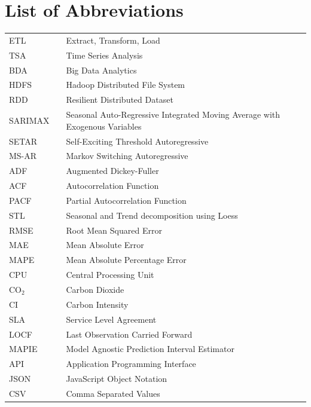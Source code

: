 \documentclass[12pt]{report}
\begin{document}
	\cleardoublepage
	
	
	
	\chapter*{List of Abbreviations\hfill} 
	\begin{tabular}{lll}
		ETL & & Extract, Transform, Load \\
		TSA & & Time Series Analysis \\
		BDA & & Big Data Analytics \\
		HDFS & & Hadoop Distributed File System \\
		RDD & & Resilient Distributed Dataset \\
		SARIMAX & & Seasonal Auto-Regressive Integrated Moving Average with Exogenous Variables \\
		SETAR & & Self-Exciting Threshold Autoregressive \\
		MS-AR & & Markov Switching Autoregressive \\
		ADF & & Augmented Dickey-Fuller \\
		ACF & & Autocorrelation Function \\
		PACF & & Partial Autocorrelation Function \\
		STL & & Seasonal and Trend decomposition using Loess \\
		RMSE & & Root Mean Squared Error \\
		MAE & & Mean Absolute Error \\
		MAPE & & Mean Absolute Percentage Error \\
		CPU & & Central Processing Unit \\
		CO$_2$ & & Carbon Dioxide \\
		CI & & Carbon Intensity \\
		SLA & & Service Level Agreement \\
		LOCF & & Last Observation Carried Forward \\
		MAPIE & & Model Agnostic Prediction Interval Estimator \\
		API & & Application Programming Interface \\
		JSON & & JavaScript Object Notation \\
		CSV & & Comma Separated Values \\
	\end{tabular}
	\newpage
	
\end{document}
